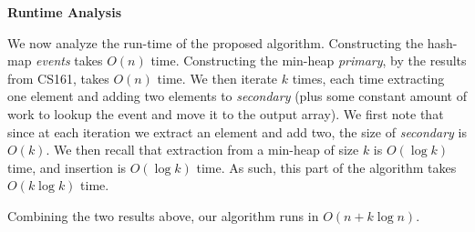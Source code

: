 \documentclass[12pt]{exam}
\newcommand*{\bigo}[1]{O \left( #1 \right)}
\begin{document}
\begin{questions}
\begin{solution}
\textbf{Runtime Analysis}

We now analyze the run-time of the proposed algorithm. Constructing the hash-map \textit{events} takes $\bigo{n}$ time. Constructing the min-heap \textit{primary}, by the results from CS161, takes $\bigo{n}$ time. We then iterate $k$ times, each time extracting one element and adding two elements to \textit{secondary} (plus some constant amount of work to lookup the event and move it to the output array). We first note that since at each iteration we extract an element and add two, the size of \textit{secondary} is $\bigo{k}$. We then recall that extraction from a min-heap of size $k$ is $\bigo{\log k}$ time, and insertion is $\bigo{\log k}$ time. As such, this part of the algorithm takes $\bigo{k \log k}$ time. 

Combining the two results above, our algorithm runs in $\bigo{n + k \log n}$.

\end{solution}


\end{questions}
\end{document}
